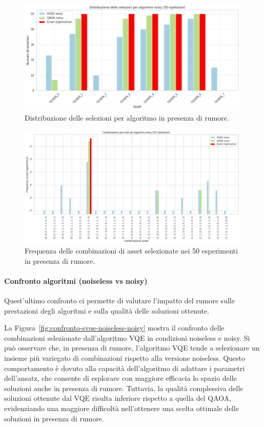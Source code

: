 \begin{figure}[ht!]
    \centering
    \includegraphics[width=0.99\textwidth]{images/risultati/noisy-risultati-2.png}
    \caption{Distribuzione delle selezioni per algoritmo in presenza di rumore.}
    \label{fig:noisy-risultati-2}
\end{figure}
\begin{figure}[ht!]
    \centering
    \includegraphics[width=0.99\textwidth]{images/risultati/noisy-risultati-3.png}
    \caption{Frequenza delle combinazioni di asset selezionate nei 50 esperimenti in presenza di rumore.}
    \label{fig:noisy-risultati-3}
\end{figure}


\paragraph{Confronto algoritmi (noiseless vs noisy)}
Quest'ultimo confronto ci permette di valutare l'impatto 
del rumore sulle prestazioni degli algoritmi e sulla qualità delle soluzioni ottenute.

La Figura~\ref{fig:confronto-svqe-noiseless-noisy} mostra il confronto delle combinazioni selezionate 
dall'algoritmo VQE in condizioni noiseless e noisy. Si può osservare che, in presenza 
di rumore, l'algoritmo VQE tende a selezionare un insieme più variegato di combinazioni 
rispetto alla versione noiseless. Questo comportamento è dovuto alla capacità 
dell'algoritmo di adattare i parametri dell'ansatz, che consente di esplorare con 
maggiore efficacia lo spazio delle soluzioni anche in presenza di rumore. Tuttavia, 
la qualità complessiva delle soluzioni ottenute dal VQE risulta inferiore rispetto a 
quella del QAOA, evidenziando una maggiore difficoltà nell'ottenere una scelta ottimale 
delle soluzioni in presenza di rumore.

